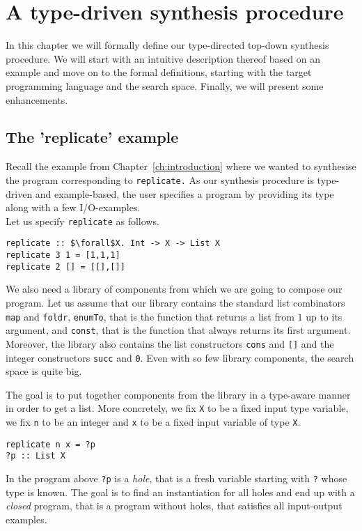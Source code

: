 \lstset{style=plain}

\chapter{A type-driven synthesis procedure} \label{ch:definitions}

In this chapter we will formally define our type-directed top-down synthesis procedure. We will start with an intuitive description thereof based on an example and move on to the formal definitions, starting with the target programming language and the search space. Finally, we will present some enhancements.

\section{The 'replicate' example}

Recall the example from Chapter~\ref{ch:introduction} where we wanted to synthesise the program corresponding to \lstinline?replicate.? As our synthesis procedure is type-driven and example-based, the user specifies a program by providing its type along with a few I/O-examples.\\
Let us specify \lstinline?replicate? as follows.
\begin{lstlisting}[style=plain]
replicate :: $\forall$X. Int -> X -> List X
replicate 3 1 = [1,1,1]
replicate 2 [] = [[],[]]
\end{lstlisting}

We also need a library of components from which we are going to compose our program. Let us assume that our library contains the standard list combinators \lstinline?map? and \lstinline?foldr?, \lstinline?enumTo?, that is the function that returns a list from $1$ up to its argument, and \lstinline?const?, that is the function that always returns its first argument. Moreover, the library also contains the list constructors \lstinline?cons? and \lstinline?[]? and the integer constructors \lstinline?succ? and \lstinline?0?. Even with so few library components, the search space is quite big.

The goal is to put together components from the library in a type-aware manner in order to get a list. More concretely, we fix \lstinline?X? to be a fixed input type variable, we fix \lstinline?n? to be an integer and \lstinline?x? to be a fixed input variable of type \lstinline?X?.
\begin{lstlisting}[style=plain]
replicate n x = ?p
?p :: List X
\end{lstlisting}
In the program above \lstinline!?p! is a \emph{hole}, that is a fresh variable starting with \lstinline!?! whose type is known. The goal is to find an instantiation for all holes and end up with a \emph{closed} program, that is a program without holes, that satisfies all input-output examples.


